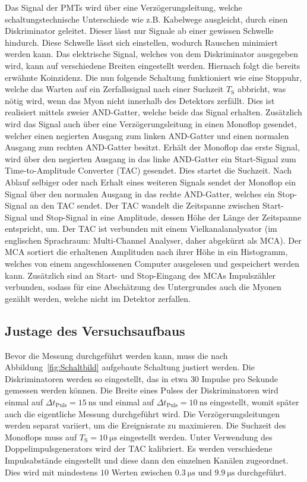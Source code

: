 \noindent
Das Signal der PMTs wird über eine Verzögerungsleitung, welche schaltungstechnische Unterschiede
wie z.B. Kabelwege ausgleicht, durch einen Diskriminator geleitet. Dieser lässt nur Signale ab
einer gewissen Schwelle hindurch. Diese Schwelle lässt sich einstellen, wodurch Rauschen
minimiert werden kann. Das elektrische Signal, welches von dem Diskriminator ausgegeben wird,
kann auf verschiedene Breiten eingestellt werden. Hiernach folgt die bereits erwähnte Koinzidenz.
Die nun folgende Schaltung funktioniert wie eine Stoppuhr, welche das Warten auf ein Zerfallssignal
nach einer Suchzeit $T_{\text{S}}$ abbricht, was nötig wird, wenn das Myon nicht innerhalb des Detektors
zerfällt. Dies ist realisiert mittels zweier AND-Gatter, welche beide das Signal erhalten. Zusätzlich
wird das Signal auch über eine Verzögerungsleitung in einen Monoflop gesendet, welcher einen negierten
Ausgang zum linken AND-Gatter und einen normalen Ausgang zum rechten AND-Gatter besitzt. Erhält der
Monoflop das erste Signal, wird über den negierten Ausgang in das linke AND-Gatter ein Start-Signal zum
Time-to-Amplitude Converter (TAC) gesendet. Dies startet die Suchzeit. Nach Ablauf selbiger oder
nach Erhalt eines weiteren Signals sendet der Monoflop ein Signal über den normalen Ausgang in
das rechte AND-Gatter, welches ein Stop-Signal an den TAC sendet.
Der TAC wandelt die Zeitspanne zwischen Start-Signal und Stop-Signal in eine Amplitude, dessen Höhe der
Länge der Zeitspanne entspricht, um.
Der TAC ist verbunden mit einem Vielkanalanalysator (im englischen Sprachraum: Multi-Channel Analyser, daher abgekürzt als MCA).
Der MCA sortiert die erhaltenen Amplituden nach ihrer Höhe in ein Histogramm, welches von einem
angeschlossenen Computer ausgelesen und gespeichert werden kann.
Zusätzlich sind an Start- und Stop-Eingang des MCAs Impulszähler verbunden, sodass für eine Abschätzung
des Untergrundes auch die Myonen gezählt werden, welche nicht im Detektor zerfallen.
\subsection{Justage des Versuchsaufbaus}
\label{JustageVersuchsaufbau}
Bevor die Messung durchgeführt werden kann, muss die nach Abbildung~\ref{fig:Schaltbild} aufgebaute Schaltung justiert
werden. Die Diskriminatoren werden so eingestellt, das in etwa $30$ Impulse pro Sekunde gemessen werden können.
Die Breite eines Pulses der Diskriminatoren wird einmal auf $\Delta t_\text{Puls} = \SI{15}{\nano\second}$ und einmal auf $\Delta t_\text{Puls} = \SI{10}{\nano\second}$
eingestellt, womit später auch die eigentliche Messung durchgeführt wird. Die Verzögerungsleitungen werden separat
variiert, um die Ereignisrate zu maximieren. Die Suchzeit des Monoflops muss auf $T_{\text{S}} = \SI{10}{\micro\second} $ eingestellt werden.
Unter Verwendung des Doppelimpulsgenerators wird der TAC kalibriert. Es werden verschiedene Impulsabstände eingestellt
und diese dann den einzelnen Kanälen zugeordnet. Dies wird mit mindestens $10$ Werten zwischen $\SI{0.3}{\micro\second}$
und $\SI{9.9}{\micro\second}$ durchgeführt.
